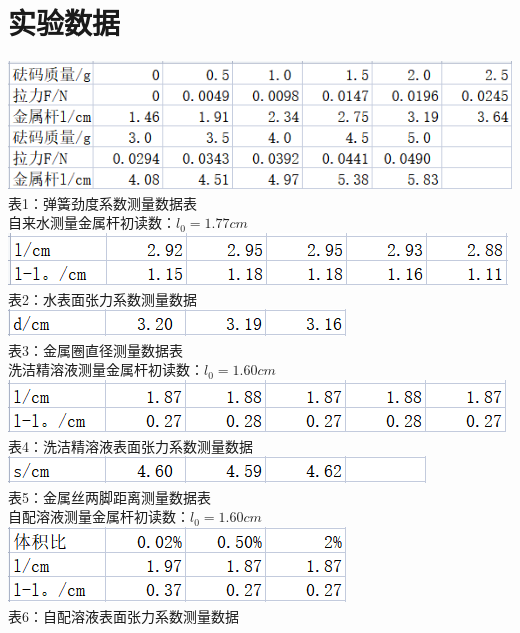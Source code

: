 \documentclass{report}
\begin{document}
	\section{实验数据}
\begin{flushleft}
	\includegraphics[scale=1]{2}\\
	表1：弹簧劲度系数测量数据表\\
	自来水测量金属杆初读数：$ l_0=1.77cm $\\
	\includegraphics{3}\\
	表2：水表面张力系数测量数据\\
	\includegraphics{4}\\
	表3：金属圈直径测量数据表\\
	洗洁精溶液测量金属杆初读数：$ l_0=1.60cm $\\
	\includegraphics{5}\\
	表4：洗洁精溶液表面张力系数测量数据\\
	\includegraphics{6}\\
	表5：金属丝两脚距离测量数据表\\
	自配溶液测量金属杆初读数：$ l_0=1.60cm $\\
	\includegraphics{7}\\
	表6：自配溶液表面张力系数测量数据
\end{flushleft}
	
\end{document}
